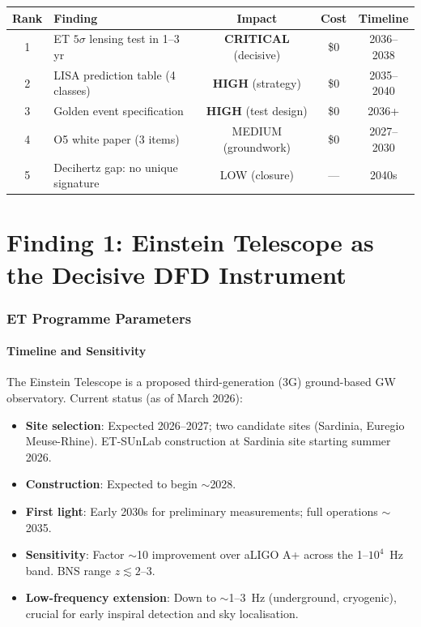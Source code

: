 \documentclass[11pt]{article}
\theoremstyle{definition}
\theoremstyle{remark}
\begin{document}
\begin{table}[H]
\centering
\small
\begin{tabular}{@{}clccc@{}}
\toprule
Rank & Finding & Impact & Cost & Timeline \\
\midrule
1 & ET $5\sigma$ lensing test in 1--3 yr & \textbf{CRITICAL} (decisive) & \$0 & 2036--2038 \\
2 & LISA prediction table (4 classes) & \textbf{HIGH} (strategy) & \$0 & 2035--2040 \\
3 & Golden event specification & \textbf{HIGH} (test design) & \$0 & 2036+ \\
4 & O5 white paper (3 items) & MEDIUM (groundwork) & \$0 & 2027--2030 \\
5 & Decihertz gap: no unique signature & LOW (closure) & --- & 2040s \\
\bottomrule
\end{tabular}
\end{table}


\part{Finding 1: Einstein Telescope as the Decisive DFD Instrument}
\label{part:ET-decisive}

\section{ET Programme Parameters}
\label{sec:ET-params}

\subsection{Timeline and Sensitivity}

The Einstein Telescope is a proposed third-generation (3G) ground-based GW
observatory. Current status (as of March 2026):
\begin{itemize}[nosep]
\item \textbf{Site selection}: Expected 2026--2027; two candidate sites
  (Sardinia, Euregio Meuse-Rhine). ET-SUnLab construction at Sardinia
  site starting summer 2026.
\item \textbf{Construction}: Expected to begin $\sim$2028.
\item \textbf{First light}: Early 2030s for preliminary measurements;
  full operations $\sim$2035.
\item \textbf{Sensitivity}: Factor $\sim$10 improvement over aLIGO A+
  across the 1--$10^4$~Hz band. BNS range $z \lesssim 2$--3.
\item \textbf{Low-frequency extension}: Down to $\sim$1--3~Hz (underground,
  cryogenic), crucial for early inspiral detection and sky localisation.
\end{itemize}
\end{document}
